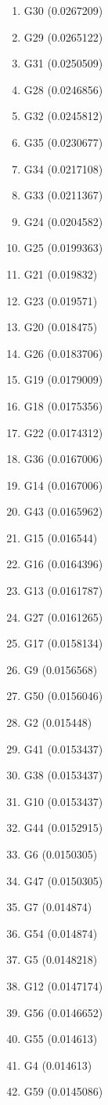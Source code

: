 \begin{enumerate}
\item G30 (0.0267209)
\item G29 (0.0265122)
\item G31 (0.0250509)
\item G28 (0.0246856)
\item G32 (0.0245812)
\item G35 (0.0230677)
\item G34 (0.0217108)
\item G33 (0.0211367)
\item G24 (0.0204582)
\item G25 (0.0199363)
\item G21 (0.019832)
\item G23 (0.019571)
\item G20 (0.018475)
\item G26 (0.0183706)
\item G19 (0.0179009)
\item G18 (0.0175356)
\item G22 (0.0174312)
\item G36 (0.0167006)
\item G14 (0.0167006)
\item G43 (0.0165962)
\item G15 (0.016544)
\item G16 (0.0164396)
\item G13 (0.0161787)
\item G27 (0.0161265)
\item G17 (0.0158134)
\item G9 (0.0156568)
\item G50 (0.0156046)
\item G2 (0.015448)
\item G41 (0.0153437)
\item G38 (0.0153437)
\item G10 (0.0153437)
\item G44 (0.0152915)
\item G6 (0.0150305)
\item G47 (0.0150305)
\item G7 (0.014874)
\item G54 (0.014874)
\item G5 (0.0148218)
\item G12 (0.0147174)
\item G56 (0.0146652)
\item G55 (0.014613)
\item G4 (0.014613)
\item G59 (0.0145086)

\end{enumerate}

